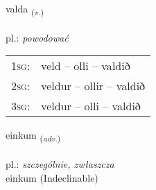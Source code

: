 \documentclass[frontgrid, backgrid]{flacards}\usepackage[]{graphicx}\usepackage[]{xcolor}
\begin{document}
\renewcommand{\blhead}{\vskip5pt {\small\bfseries\footnotesize Sagnorð | Verb }}
\renewcommand{\bcfoot}{\vskip5pt \hspace{2pt}{\small\bfseries\footnotesize 1K}}


{valda \small{\textsubscript{(\textit{v.})}} \\[1ex] %
\textphonetic{[valta]} \\
pl.: \emph{powodować} \\  [2ex]
\renewcommand*{\arraystretch}{0.8}
\begin{tabular}{p{1cm}l}
\textsc{1sg}: & veld -- olli -- valdið \\ 
\textsc{2sg}: & veldur -- ollir -- valdið \\ 
\textsc{3sg}: & veldur -- olli -- valdið \\ 
\end{tabular}
}


\renewcommand{\flhead}{\vskip5pt \fboxsep=0pt {\small\bfseries\footnotesize Atviksorð | Adverb}}
\renewcommand{\fcfoot}{\vskip5pt \fboxsep=0pt \hspace{2pt}{\small\bfseries\footnotesize 1K}}

\renewcommand{\blhead}{\vskip5pt {\small\bfseries\footnotesize Atviksorð | Adverb }}
\renewcommand{\bcfoot}{\vskip5pt \hspace{2pt}{\small\bfseries\footnotesize 1K}}


{einkum \small{\textsubscript{(\textit{adv.})}} \\[1ex]
 \\
pl.: \emph{szczególnie, zwłaszcza} \\  [2ex]
einkum (Indeclinable)}

\renewcommand{\flhead}{\vskip5pt \fboxsep=0pt {\small\bfseries\footnotesize Nafnorð | Noun}}
\renewcommand{\fcfoot}{\vskip5pt \fboxsep=0pt \hspace{2pt}{\small\bfseries\footnotesize 1K}}

\renewcommand{\blhead}{\vskip5pt {\small\bfseries\footnotesize Nafnorð | Noun }}
\renewcommand{\bcfoot}{\vskip5pt \hspace{2pt}{\small\bfseries\footnotesize 1K}}
\end{document}
